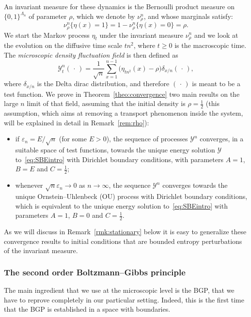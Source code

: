 \documentclass[AHL,Unicode,longabstracts]{cedram}
\newcommand{\mc}[1]{{\mathcal #1}}
\renewcommand{\mc}[1]{{\mathcal #1}}
\renewcommand{\ge}{\geqslant}
\begin{document}
An invariant measure for these dynamics is the Bernoulli product measure on $\{0,1\}^{\Lambda_n}$ of parameter $\rho$, which we denote by $\nu_\rho^n$, and whose marginals satisfy:
\[
\nu_\rho^n\big\{\eta(x)=1\big\}=1-\nu_\rho^n\big\{\eta(x)=0\big\}=\rho.
\]
We start the Markov process $\eta_t$ under the invariant measure $\nu_\rho^n$ and we look at the evolution on the diffusive time scale $tn^2$, where $t\ge 0$ is the macroscopic time. The \emph{microscopic density fluctuation field} is then defined as
\begin{equation}\label{eq:fieldintro}
\mc Y_t^n({\,\cdot\,}) = \frac{1}{\sqrt n}\sum_{x=1}^{n-1} \big(\eta_{tn^2}(x) - \rho \big) \delta_{x /n}({\,\cdot\,}),
\end{equation}
where $\delta_{x/n}$ is the Delta dirac distribution, and therefore $({\,\cdot\,})$ is meant to be a test function. We prove in Theorem~\ref{theo:convergence} two main results on the large $n$ limit of that field, assuming that the initial density is $\rho=\frac12$ (this assumption, which aims at removing a transport phenomenon inside the system, will be explained in detail in Remark~\ref{rem:rho}):
\begin{itemize}
\item if $\varepsilon_n = E/\sqrt n$ (for some $E>0$), the sequence of processes $\mc Y^n$ converges, in a suitable space of test functions, towards the unique energy solution $\mc Y$ to~\eqref{eq:SBEintro} with Dirichlet boundary conditions, with parameters $A=1$, $B=E$ and $C=\frac12$;
\item whenever $\sqrt n\varepsilon_n \to 0$ as $n\to \infty$, the sequence $\mc Y^n$ converges towards the unique Ornstein--Uhlenbeck (OU) process with Dirichlet boundary conditions, which is equivalent to the unique energy solution to~\eqref{eq:SBEintro} with parameters $A=1$, $B=0$ and $C=\frac12$.
\end{itemize}

As we will discuss in Remark~\ref{rmk:stationary} below it is easy to generalize these convergence results to initial conditions that are bounded entropy perturbations of the invariant measure.


\subsubsection{The second order Boltzmann--Gibbs principle} The main ingredient that we use at the microscopic level is the BGP, that we have to reprove completely in our particular setting. Indeed, this is the first time that the BGP is established in a space with boundaries.
\end{document}
